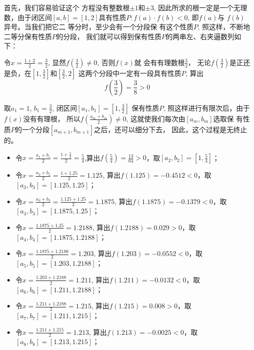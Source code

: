 首先，我们容易验证这个
方程没有整数根$\pm 1$和$\pm 3$, 
因此所求的根一定是一个无理
数，由于闭区间$[a,b]=
[1,2]$具有性质$P:f(a)\cdot f(b)<0$, 即$f(a)$与
$f(b)$异号。当我们把它二
等分时，至少会有一个分段保
有这个性质$P$, 照这样，不断地二等分保有性质$P$的分段，
我们就可以得到保有性质$P$的两串左、右夹逼数列如下：

令$x=\frac{1+2}{2}=\frac{3}{2}$, 
显然$f\left(\frac{3}{2}\right)\ne 0$, 否则$f(x)$就
会有有理数根$\frac{3}{2}$，
无论$f\left(\frac{3}{2}\right)$是正还是负，在$\left[1,\frac{3}{2}\right]$和$\left[\frac{3}{2},2\right]$
这两个分段中一定有一段具有性质$P$, 算出
\[f\left(\frac{3}{2}\right)=\frac{3}{8}>0\]

取$a_1=1$, $b_1=\frac{3}{2}$, 
闭区间$[a_1,b_1]=\left[1,\frac{3}{2}\right]$
保有性质$P$, 照这样进行有限次后，由于$f(x)$没有有理根，
所以$f\left(\frac{a_m+b_m}{2}\right)\ne 0$, 这就使我们每次由$[a_m,b_m]$选取保
有性质$P$的一个分段$[a_{m+1},b_{m+1}]$之后，还可以细分下去，
因此，这个过程是无终止的。
\begin{itemize}
\item 令$x=\frac{a_1+b_1}{2}=\frac{1+\frac{3}{2}}{2}=\frac{5}{4}$,算出$f\left(\frac{5}{4}\right)=\frac{13}{64}>0$，取$[a_2,b_2]=\left[1,\frac{5}{4}\right]$；
\item 
令$x=\frac{a_2+b_2}{2}=\frac{1+1.25}{2}=1.125$, 算出$f\left(1.125\right)=-0.4512<0$，取$[a_3,b_3]=\left[1.125,1.25\right]$；
\item 
令$x=\frac{a_3+b_3}{2}=\frac{1.125+1.25}{2}=1.1875$, 算出$f\left(1.1875\right)=-0.1379<0$，取$[a_3,b_3]=\left[1.1875,1.25\right]$；
\item 
令$x=\frac{1.1875+1.25}{2}=1.2188$, 算出$f\left(1.2188\right)=0.029>0$，取$[a_4,b_4]=\left[1.1875,1.2188\right]$；

\item 
令$x=\frac{1.1875+1.2188}{2}=1.203$, 算出$f\left(1.203\right)=-0.0552<0$，取$[a_5,b_5]=\left[1.203,1.2188\right]$；

\item 
令$x=\frac{1.203+1.2188}{2}=1.211$, 算出$f\left(1.211\right)=-0.0132<0$，取$[a_6,b_6]=\left[1.211,1.2188\right]$；

\item 
令$x=\frac{1.211+1.2188}{2}=1.215$, 算出$f\left(1.215\right)=0.008>0$，取$[a_7,b_7]=\left[1.211,1.215\right]$；

\item 
令$x=\frac{1.211+1.215}{2}=1.213$, 算出$f\left(1.213\right)=-0.0025<0$，取$[a_8,b_8]=\left[1.213,1.215\right]$；

\end{itemize}

